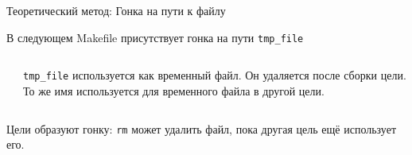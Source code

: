     \begin{frame}[label=current]{Теоретический метод: Гонка на пути к файлу}

        В следующем Makefile присутствует гонка на пути \texttt{tmp\_file}

        \begin{columns}[t]
            \begin{column}{.45 \textwidth}
                \newline
                
            \end{column}
            \begin{column}{.4 \textwidth}
                \newline \newline \newline \newline
                \texttt{tmp\_file} используется как временный файл.
                \newline
                Он удаляется после сборки цели.
                \newline \newline \newline
                То же имя используется для
                \newline
                временного файла в другой
                \newline
                цели.
            \end{column}
        \end{columns}

        Цели образуют гонку: \texttt{rm} может удалить файл, пока другая цель ещё использует его.

    \end{frame}


